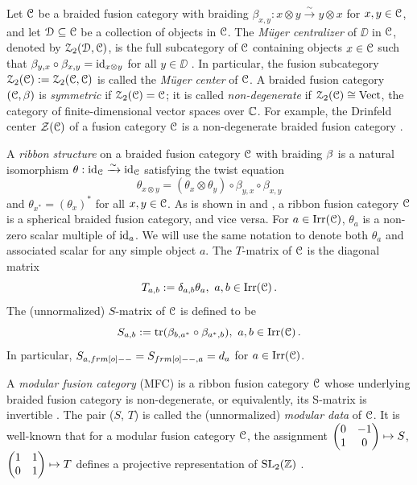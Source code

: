 \documentclass[11pt]{article}
\begin{document}
Let ${\mathcal{C}}$ be a braided fusion category with braiding $\beta_{x,y}: x \otimes y \xrightarrow{\sim} y \otimes x$ for $x, y \in \mathcal{C}$, and let $\mathcal{D} \subseteq {\mathcal{C}}$ be a collection of objects in ${\mathcal{C}}$. The \emph{M\"uger centralizer} of $\DD$ in ${\mathcal{C}}$, denoted by $\mathcal{Z}_{2}(\mathcal{D}, \mathcal{C})$, is the full subcategory of ${\mathcal{C}}$ containing objects $x \in {\mathcal{C}}$ such that $\beta_{y, x} \circ \beta_{x, y} = {\operatorname{id}}_{x \otimes y}$ for all $y \in \DD$ \cite{Mug032}. In particular, the fusion subcategory $\mathcal{Z}_{2}(\mathcal{C}) := \mathcal{Z}_{2}({\mathcal{C}}, \mathcal{C})$ is called the \emph{M\"uger center} of ${\mathcal{C}}$. A braided fusion category $({\mathcal{C}}, \beta)$ is \emph{symmetric} if $\mathcal{Z}_{2}(\mathcal{C}) = {\mathcal{C}}$; it is called \emph{non-degenerate} if $\mathcal{Z}_{2}(\mathcal{C}) \cong {\operatorname{Vect}}$, the category of finite-dimensional vector spaces over $\mathbb{C}$. For example, the Drinfeld center $\zdr(\cC)$ of a fusion category $\mathcal{C}$ \cite{Maj91,JS91} is a non-degenerate braided fusion category \cite[Cor.\ 3.9]{DGNO-BFC}.

A \emph{ribbon structure} on a braided fusion category $\mathcal{C}$ with braiding ${\beta}$ is a natural isomorphism $\theta: {\operatorname{id}}_{\mathcal{C}} \xrightarrow{\sim} {\operatorname{id}}_{\mathcal{C}}$ satisfying the twist equation 
\begin{equation}\label{eq:tw-def}
\theta_{x\otimes y} = (\theta_{x} \otimes \theta_y)\circ \beta_{y, x} \circ \beta_{x, y} 
\end{equation}
and $\theta_{x^*} = (\theta_x)^*$ for all $x, y \in \mathcal{C}$. As is shown in \cite[Prop.\ 8.10.12]{EGNO} and \cite[p.38]{NS07}, a ribbon fusion category $\mathcal{C}$ is a spherical braided fusion category, and vice versa. For $a \in {\operatorname{Irr}}(\mathcal{C})$, $\theta_a$ is a non-zero scalar multiple of ${\operatorname{id}}_a$. We will use the same notation to denote both $\theta_a$ and associated scalar for any simple object $a$. The $T$-matrix of ${\mathcal{C}}$ is the diagonal matrix
\[
T_{a, b} := \delta_{a, b} \theta_{a},\ a, b \in {\operatorname{Irr}}({\mathcal{C}})\,.
\]
The (unnormalized) $S$-matrix of ${\mathcal{C}}$ is defined to be
\[
S_{a, b} := {\operatorname{tr}}(\beta_{b, a^*}\circ \beta_{a^*, b}),
\  a, b \in {\operatorname{Irr}}({\mathcal{C}})\,.
\]
In particular, $S_{a, \1} = S_{\1, a} = d_a$ for $a \in {\operatorname{Irr}}(\mathcal{C})$. 

A \emph{modular fusion category} (MFC) is a ribbon fusion category $\mathcal{C}$ whose underlying braided fusion category is non-degenerate, or equivalently, its S-matrix is invertible \cite{Mug032}. The pair ($S$, 
$T$) is called the (unnormalized) \emph{modular data} of ${\mathcal{C}}$. It is well-known that for a modular fusion category $\mathcal{C}$, the assignment ${\begin{pmatrix}0&-1\\1&0\end{pmatrix}} \mapsto S$, ${\begin{pmatrix}1&1\\0&1\end{pmatrix}} \mapsto T$ defines a projective representation of ${\operatorname{SL}}_2({\mathbb{Z}})$ \cite{Tur10}. 
\end{document}
